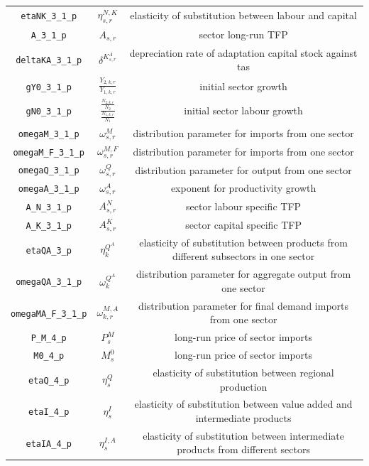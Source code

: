 \begin{center}
\begin{longtable}{ccc}
\texttt{etaNK\_3\_1\_p} & ${\eta^{N,K}_{s,r}}$ & elasticity of substitution between labour and capital\\
\texttt{A\_3\_1\_p} & ${A_{s,r}}$ & sector long-run TFP\\
\texttt{deltaKA\_3\_1\_p} & ${\delta^{K^{A}_{s,r}}}$ & depreciation rate of adaptation capital stock against tas\\
\texttt{gY0\_3\_1\_p} & ${\frac{Y_{2,k,r}}{Y_{1,k,r}}}$ & initial sector growth\\
\texttt{gN0\_3\_1\_p} & ${\frac{\frac{N_{2,k,r}}{N_{2}}}{\frac{N_{1,k,r}}{N_{1}}}}$ & initial sector labour growth\\
\texttt{omegaM\_3\_1\_p} & ${\omega^{M}_{s,r}}$ & distribution parameter for imports from one sector\\
\texttt{omegaM\_F\_3\_1\_p} & ${\omega^{M,F}_{s,r}}$ & distribution parameter for imports from one sector\\
\texttt{omegaQ\_3\_1\_p} & ${\omega^{Q}_{s,r}}$ & distribution parameter for output from one sector\\
\texttt{omegaA\_3\_1\_p} & ${\omega^{A}_{s,r}}$ & exponent for productivity growth\\
\texttt{A\_N\_3\_1\_p} & ${A^{N}_{s,r}}$ & sector labour specific TFP\\
\texttt{A\_K\_3\_1\_p} & ${A^{K}_{s,r}}$ & sector capital specific TFP\\
\texttt{etaQA\_3\_p} & ${\eta^{Q^A}_{k}}$ & elasticity of substitution between products from different subsectors in one sector\\
\texttt{omegaQA\_3\_1\_p} & ${\omega^{Q^A}_{k}}$ & distribution parameter for aggregate output from one sector\\
\texttt{omegaMA\_F\_3\_1\_p} & ${\omega^{M,A}_{k,r}}$ & distribution parameter for final demand imports from one sector\\
\texttt{P\_M\_4\_p} & ${P^{M}_{s}}$ & long-run price of sector imports\\
\texttt{M0\_4\_p} & ${M^{0}_{s}}$ & long-run price of sector imports\\
\texttt{etaQ\_4\_p} & ${\eta^{Q}_{s}}$ & elasticity of substitution between regional production\\
\texttt{etaI\_4\_p} & ${\eta^{I}_{s}}$ & elasticity of substitution between value added and intermediate products\\
\texttt{etaIA\_4\_p} & ${\eta^{I,A}_{s}}$ & elasticity of substitution between intermediate products from different sectors\\

\end{longtable}
\end{center}
